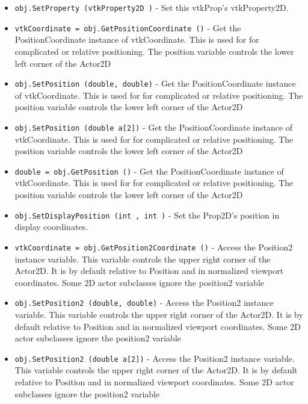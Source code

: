 \begin{itemize}
\item  \verb|obj.SetProperty (vtkProperty2D )| -  Set this vtkProp's vtkProperty2D.

\item  \verb|vtkCoordinate = obj.GetPositionCoordinate ()| -  Get the PositionCoordinate instance of vtkCoordinate.
 This is used for for complicated or relative positioning.
 The position variable controls the lower left corner of the Actor2D

\item  \verb|obj.SetPosition (double, double)| -  Get the PositionCoordinate instance of vtkCoordinate.
 This is used for for complicated or relative positioning.
 The position variable controls the lower left corner of the Actor2D

\item  \verb|obj.SetPosition (double a[2])| -  Get the PositionCoordinate instance of vtkCoordinate.
 This is used for for complicated or relative positioning.
 The position variable controls the lower left corner of the Actor2D

\item  \verb|double = obj.GetPosition ()| -  Get the PositionCoordinate instance of vtkCoordinate.
 This is used for for complicated or relative positioning.
 The position variable controls the lower left corner of the Actor2D

\item  \verb|obj.SetDisplayPosition (int , int )| -  Set the Prop2D's position in display coordinates.

\item  \verb|vtkCoordinate = obj.GetPosition2Coordinate ()| -  Access the Position2 instance variable. This variable controls
 the upper right corner of the Actor2D. It is by default
 relative to Position and in normalized viewport coordinates.
 Some 2D actor subclasses ignore the position2 variable

\item  \verb|obj.SetPosition2 (double, double)| -  Access the Position2 instance variable. This variable controls
 the upper right corner of the Actor2D. It is by default
 relative to Position and in normalized viewport coordinates.
 Some 2D actor subclasses ignore the position2 variable

\item  \verb|obj.SetPosition2 (double a[2])| -  Access the Position2 instance variable. This variable controls
 the upper right corner of the Actor2D. It is by default
 relative to Position and in normalized viewport coordinates.
 Some 2D actor subclasses ignore the position2 variable


\end{itemize}
